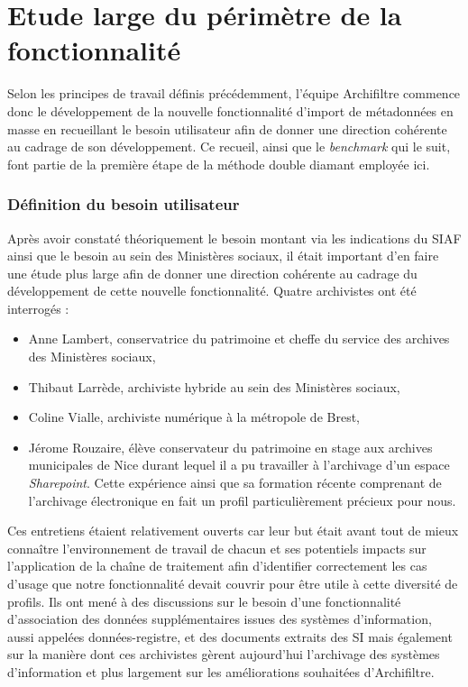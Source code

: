 \chapter{Etude large du périmètre de la fonctionnalité}


Selon les principes de travail définis précédemment, l’équipe \gls{Archifiltre} commence donc le développement de la nouvelle fonctionnalité d’import de métadonnées en masse en recueillant le besoin utilisateur afin de donner une direction cohérente au cadrage de son développement. Ce recueil, ainsi que le \textit{\gls{benchmark}} qui le suit, font partie de la première étape de la méthode double diamant employée ici. 


\subsection{Définition du besoin utilisateur}
Après avoir constaté théoriquement le besoin montant via les indications du SIAF ainsi que le besoin au sein des Ministères sociaux, il était important d’en faire une étude plus large afin de donner une direction cohérente au cadrage du développement de cette nouvelle fonctionnalité. Quatre archivistes ont été interrogés : 
\begin{itemize}
	\item Anne Lambert, conservatrice du patrimoine et cheffe du service des archives des Ministères sociaux, 
	\item Thibaut Larrède, archiviste hybride au sein des Ministères sociaux, 
	\item Coline Vialle, archiviste  numérique à la métropole de Brest,
	\item Jérome Rouzaire, élève conservateur du patrimoine en stage aux archives municipales de Nice durant lequel il a pu travailler à l’archivage d’un espace \textit{Sharepoint}. Cette expérience ainsi que sa formation récente comprenant de l’archivage électronique en fait un profil particulièrement précieux pour nous.
\end{itemize} 
Ces entretiens étaient relativement ouverts car leur but était avant tout de mieux connaître l’environnement de travail de chacun et ses potentiels impacts sur l'application de la chaîne de traitement afin d’identifier correctement les cas d’usage que notre fonctionnalité devait couvrir pour être utile à cette diversité de profils. Ils ont mené à des discussions sur le besoin d’une fonctionnalité d’association des données supplémentaires issues des systèmes d’information, aussi appelées données-registre, et des documents extraits des \gls{SI} mais également sur la manière dont ces archivistes gèrent aujourd’hui l’archivage des systèmes d’information et plus largement sur les améliorations souhaitées d’\gls{Archifiltre}. 


